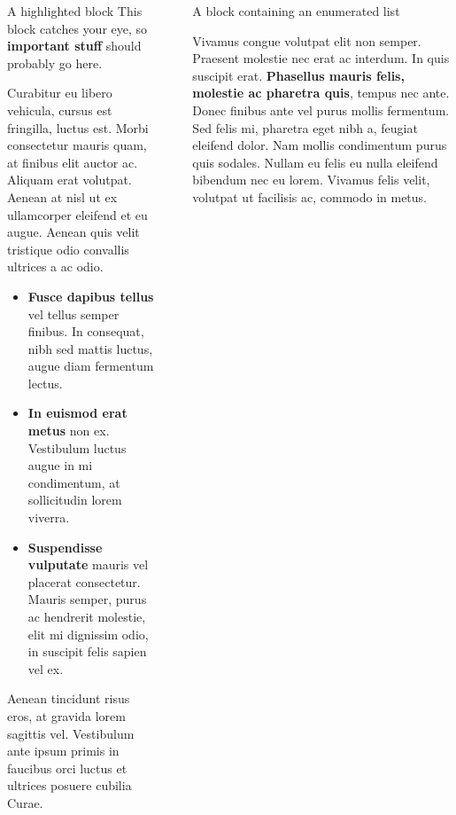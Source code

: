 \documentclass[final]{beamer}
\newlength{\sepwidth}
\newlength{\colwidth}
\newcommand{\separatorcolumn}{\begin{column}{\sepwidth}\end{column}}
\begin{document}
\begin{frame}[t]
\begin{columns}[t]
\begin{column}{\colwidth}
\begin{alertblock}{A highlighted block}
    This block catches your eye, so \textbf{important stuff} should probably go
    here.

    Curabitur eu libero vehicula, cursus est fringilla, luctus est. Morbi
    consectetur mauris quam, at finibus elit auctor ac. Aliquam erat volutpat.
    Aenean at nisl ut ex ullamcorper eleifend et eu augue. Aenean quis velit
    tristique odio convallis ultrices a ac odio.

    \begin{itemize}
      \item \textbf{Fusce dapibus tellus} vel tellus semper finibus. In
        consequat, nibh sed mattis luctus, augue diam fermentum lectus.
      \item \textbf{In euismod erat metus} non ex. Vestibulum luctus augue in
        mi condimentum, at sollicitudin lorem viverra.
      \item \textbf{Suspendisse vulputate} mauris vel placerat consectetur.
        Mauris semper, purus ac hendrerit molestie, elit mi dignissim odio, in
        suscipit felis sapien vel ex.
    \end{itemize}

    Aenean tincidunt risus eros, at gravida lorem sagittis vel. Vestibulum ante
    ipsum primis in faucibus orci luctus et ultrices posuere cubilia Curae.

  \end{alertblock}

\end{column}

\separatorcolumn

\begin{column}{\colwidth}

  \begin{block}{A block containing an enumerated list}

    Vivamus congue volutpat elit non semper. Praesent molestie nec erat ac
    interdum. In quis suscipit erat. \textbf{Phasellus mauris felis, molestie
    ac pharetra quis}, tempus nec ante. Donec finibus ante vel purus mollis
    fermentum. Sed felis mi, pharetra eget nibh a, feugiat eleifend dolor. Nam
    mollis condimentum purus quis sodales. Nullam eu felis eu nulla eleifend
    bibendum nec eu lorem. Vivamus felis velit, volutpat ut facilisis ac,
    commodo in metus.


\end{block}
\end{column}
\end{columns}
\end{frame}
\end{document}
